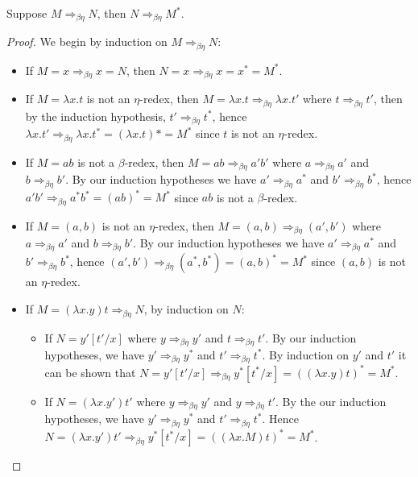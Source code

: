 \begin{lemma}\label{cd_lemma_beta_eta}
    Suppose $M \Rightarrow_{\beta\eta} N$, then $N \Rightarrow_{\beta\eta} M^*$.    
\end{lemma}

\begin{proof}
    We begin by induction on $M \Rightarrow_{\beta\eta} N$:
    \begin{itemize}
        \item If $M = x \Rightarrow_{\beta\eta} x = N$, then $N = x \Rightarrow_{\beta\eta} x = x^* = M^*$.
        \item If $M = \lambda x . t$ is not an $\eta$-redex, then $M = \lambda x . t \Rightarrow_{\beta\eta} \lambda x . t'$ where $t \Rightarrow_{\beta\eta} t'$, then by the induction hypothesis, $t' \Rightarrow_{\beta\eta} t^*$, hence $\lambda x . t' \Rightarrow_{\beta\eta} \lambda x . t^*=(\lambda x . t)* = M^*$ since $t$ is not an $\eta$-redex.
        \item If $M = a b$ is not a $\beta$-redex, then $M = a b \Rightarrow_{\beta\eta} a' b'$ where $a \Rightarrow_{\beta\eta} a'$ and $b \Rightarrow_{\beta\eta} b'$. By our induction hypotheses we have $a' \Rightarrow_{\beta\eta} a^*$ and $b' \Rightarrow_{\beta\eta} b^*$, hence $a' b' \Rightarrow_{\beta\eta} a^* b^* = (ab)^* = M^*$ since $ab$ is not a $\beta$-redex.
        \item If $M = (a, b)$ is not an $\eta$-redex, then $M = (a, b) \Rightarrow_{\beta\eta} (a', b')$ where $a \Rightarrow_{\beta\eta} a'$ and $b \Rightarrow_{\beta\eta} b'$. By our induction hypotheses we have $a' \Rightarrow_{\beta\eta} a^*$ and $b' \Rightarrow_{\beta\eta} b^*$, hence $(a', b') \Rightarrow_{\beta\eta} (a^*, b^*) = (a, b)^* = M^*$ since $(a, b)$ is not an $\eta$-redex.
        \item If $M = (\lambda x . y)t \Rightarrow_{\beta\eta} N$, by induction on $N$:
        \begin{itemize}
            \item If $N = y'[t'/x]$ where $y \Rightarrow_{\beta\eta} y'$ and $t \Rightarrow_{\beta\eta} t'$. By our induction hypotheses, we have $y' \Rightarrow_{\beta\eta} y^*$ and $t' \Rightarrow_{\beta\eta}t^*$. By induction on $y'$ and $t'$ it can be shown that $N = y'[t'/x] \Rightarrow_{\beta\eta} y^*[t^*/x]=((\lambda x . y)t)^* = M^*$.
            \item If $N = (\lambda x . y')t'$ where $y \Rightarrow_{\beta\eta} y'$ and $y \Rightarrow_{\beta\eta} t'$. By the our induction hypotheses, we have $y' \Rightarrow_{\beta\eta} y^*$ and $t' \Rightarrow_{\beta\eta} t^*$. Hence $N = (\lambda x . y')t' \Rightarrow_{\beta\eta} y^*[t^*/x] = ((\lambda x . M)t)^* = M^*$.

\end{itemize}
\end{itemize}
\end{proof}
